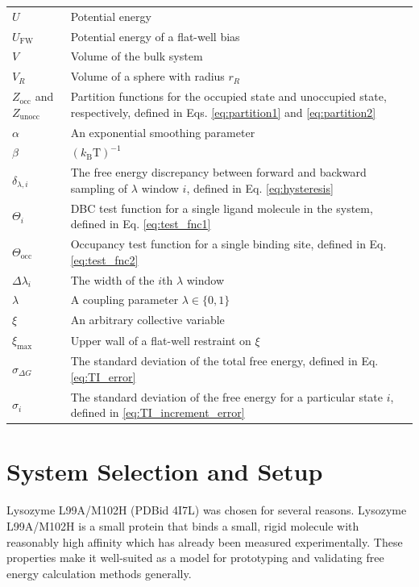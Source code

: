 \documentclass[9pt,tutorial,pubversion]{Styling/livecoms}
\begin{document}
\begin{table}[H]
{\begin{tabular}{  p{.25\linewidth} | p{.75\linewidth}  }
        $U$ & Potential energy\\
        $U_\mathrm{FW}$ & Potential energy of a flat-well bias\\
        $V$ & Volume of the bulk system\\
        $V_R$ & Volume of a sphere with radius $r_R$\\
        $Z_\mathrm{occ}$ and $Z_\mathrm{unocc}$ & Partition functions for the occupied state and unoccupied state, respectively, defined in Eqs. \ref{eq:partition1} and \ref{eq:partition2}\\
        $\alpha$ & An exponential smoothing parameter\\
        $\beta$ & $(k_\mathrm{B}\mathrm{T})^{-1}$\\
        $\delta_{\lambda,i}$ & The free energy discrepancy between forward and backward sampling of $\lambda$ window $i$, defined in Eq. \ref{eq:hysteresis}\\
        $\Theta_i$ & DBC test function for a single ligand molecule in the system, defined in Eq. \ref{eq:test_fnc1}\\
        $\Theta_\mathrm{occ}$ & Occupancy test function for a single binding site, defined in Eq. \ref{eq:test_fnc2}\\
        $\Delta \lambda_i$ & The width of the $i$th $\lambda$ window\\
        $\lambda$ & A coupling parameter $\lambda\in\{0,1\}$\\
        $\xi$ & An arbitrary collective variable\\
        $\xi_\mathrm{max}$ & Upper wall of a flat-well restraint on $\xi$\\
        $\sigma_{\Delta G}$ & The standard deviation of the total free energy, defined in Eq. \ref{eq:TI_error}\\
        $\sigma_i$ & The standard deviation of the free energy for a particular state $i$, defined in \ref{eq:TI_increment_error}\\
        \hline
    \end{tabular}}
\end{table}

    

\setcounter{section}{0}
\renewcommand\thesection{Appendix~\Alph{section}}
\renewcommand\thesubsection{\thesection.\arabic{subsection}}

\section{System Selection and Setup}
\label{app:motivation}
Lysozyme L99A/M102H (PDBid 4I7L) was chosen for several reasons. Lysozyme L99A/M102H is a small protein that binds a small, rigid molecule with reasonably high affinity which has already been measured experimentally. These properties make it well-suited as a model for prototyping and validating free energy calculation methods generally. 
\end{document}
